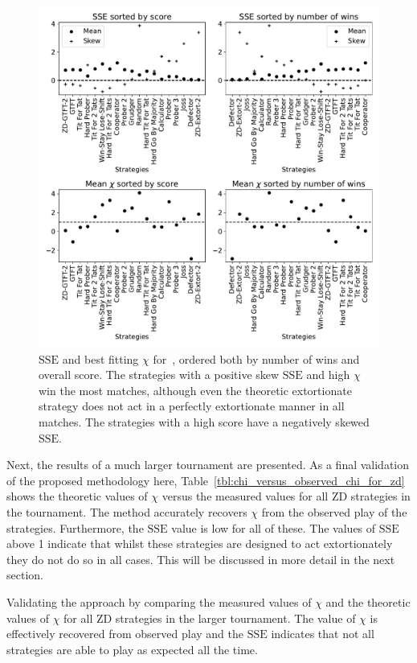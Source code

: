 \documentclass[a4paper]{article}
\newcommand{\SSe}{\text{SSE}}
\begin{document}
\begin{figure}[!htbp]
    \centering
    \includegraphics[width=.8\textwidth]{./assets/img/sserror_in_stewart_plotkin/main.pdf}
    \caption{\(\SSe\) and best fitting \(\chi\) for~\cite{Stewart2012},
        ordered both by number of wins and overall score.
        The strategies with a positive skew
        \(\SSe\) and high \(\chi\) win the most matches, although even the
        theoretic
        extortionate strategy does not act in a perfectly extortionate manner in
        all matches. The strategies with a high score have a negatively skewed
        \(\SSe\).
        }
    \label{fig:sserror_in_stewart_plotkin}
\end{figure}

Next, the results of a much larger tournament are presented.
As a final validation of the proposed methodology here,
Table~\ref{tbl:chi_versus_observed_chi_for_zd} shows the theoretic values of
\(\chi\) versus the measured values for all ZD strategies in the tournament.
The method accurately recovers \(\chi\) from the observed play of
the strategies. Furthermore, the \(\SSe\) value is low for all of these. The
values of \(\SSe\) above 1 indicate that whilst these strategies are designed to
act extortionately they do not do so in all cases. This will be discussed in
more detail in the next section.

\begin{table}[!hbtp]
    \begin{center}
   
    \end{center}
    \caption{Validating the approach by comparing the measured values of
    \(\chi\) and the theoretic values of
    \(\chi\) for all ZD strategies in the larger tournament. The value of
    \(\chi\) is effectively recovered from observed play and the \(\SSe\)
    indicates that not all strategies are able to play as expected all the
time.}
    \label{tbl:chi_versus_observed_chi_for_zd}
\end{table}
\end{document}

